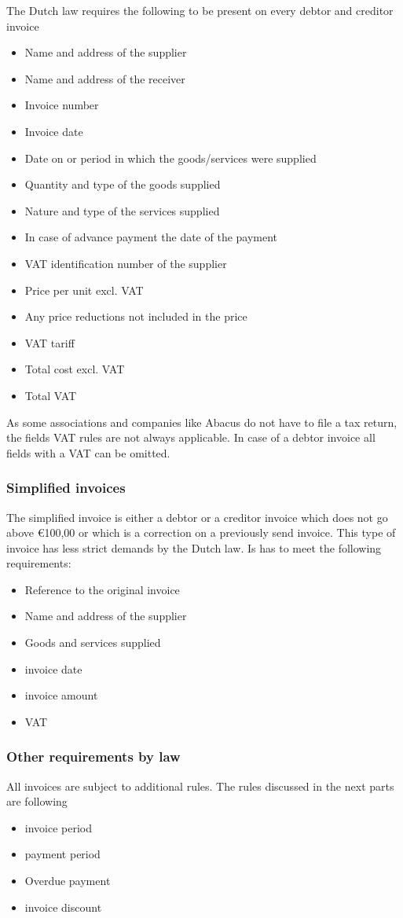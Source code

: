 \documentclass{report}
\begin{document}
The Dutch law requires the following to be present on every debtor and creditor invoice
\begin{itemize}
	\item Name and address of the supplier
	\item Name and address of the receiver
	\item Invoice number
	\item Invoice date
	\item Date on or period in which the goods/services were supplied
	\item Quantity and type of the goods supplied
	\item Nature and type of the services supplied
	\item In case of advance payment the date of the payment
	\item VAT identification number of the supplier
	\item Price per unit excl. VAT
	\item Any price reductions not included in the price
	\item VAT tariff
	\item Total cost excl. VAT
	\item Total VAT
\end{itemize}
As some associations and companies like Abacus do not have to file a tax return, the fields VAT rules are not always applicable. In case of a debtor invoice all fields with a VAT can be omitted.

\subsubsection{Simplified invoices}\label{subsec:simplified_invoice}
The simplified invoice is either a debtor or a creditor invoice which does not go above \euro100,00 or which is a correction on a previously send invoice.
This type of invoice has less strict demands by the Dutch law. Is has to meet the following requirements:
\begin{itemize}
	\item Reference to the original invoice
	\item Name and address of the supplier
	\item Goods and services supplied 
	\item invoice date
	\item invoice amount
	\item VAT
\end{itemize}
 
\subsubsection{Other requirements by law}
All invoices are subject to additional rules. The rules discussed in the next parts are following
\begin{itemize}
	\item invoice period
	\item payment period
	\item Overdue payment
	\item invoice discount
\end{itemize}
\end{document}
